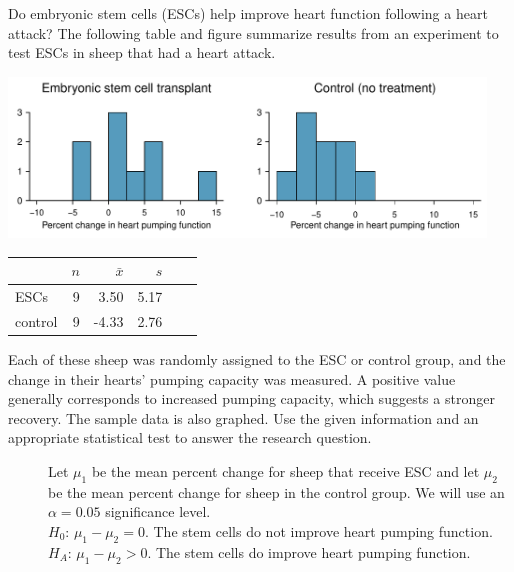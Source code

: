 \begin{examplewrap}
\begin{nexample} 
{\label{exerciseToEvaluteWhetherESCsAreHelpfulInImprovingHeartFunctionInSheep}
Do embryonic stem cells (ESCs) help improve heart function following a heart attack? The following table and figure summarize results from an experiment to test ESCs in sheep that had a heart attack.
\begin{center}
\includegraphics[width=0.95\textwidth]{ch_inference_for_means/figures/stemCellTherapyForHearts/stemCellTherapyForHearts}

\begin{tabular}{l rrrrr}
\hline
\hspace{10mm}	& $n$	& $\bar{x}$	& $s$  	 \\
\hline
ESCs		& 9		& 3.50		& 5.17  	\\
control		& 9		& -4.33		& 2.76  	 \\
\hline
\end{tabular}
\end{center}
Each of these sheep was randomly assigned to the ESC or control group, and the change in their hearts' pumping capacity was measured. A positive value generally corresponds to increased pumping capacity, which suggests a stronger recovery. The sample data is also graphed.  Use the given information and an appropriate statistical test to answer the research question.
}
\begin{description}
\item[]  Let $\mu_1$ be the mean percent change for sheep that receive ESC and let $\mu_2$ be the mean percent change for sheep in the control group.  We will use an $\alpha=0.05$ significance level. \\
$H_0$: $\mu_{1} - \mu_{2} = 0$. The stem cells do not improve heart pumping function.\\
$H_A$: $\mu_{1} - \mu_{2} > 0$. The stem cells do improve heart pumping function.


\end{description}
\end{nexample}
\end{examplewrap}
